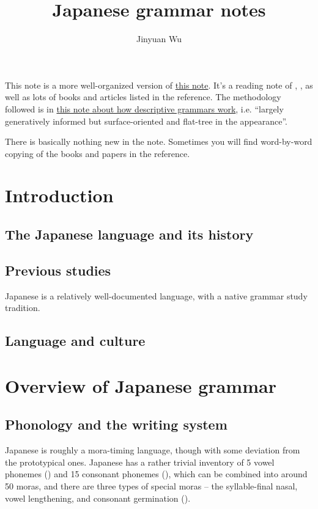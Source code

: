 \documentclass[UTF8, a4paper, oneside, scheme=plain]{ctexrep}
\title{Japanese grammar notes}
\author{Jinyuan Wu}
\newcommand{\method}{\href{../methodology/glossing.pdf}{this note about how descriptive grammars work}}
\begin{document}
\maketitle

This note is a more well-organized version of \href{./japanese-note-1.pdf}{this note}.
It's a reading note of \citet{akiyama2012japanese}, \citet{tsutsui1989dictionary},
as well as lots of books and articles listed in the reference.
The methodology followed is in \method,
i.e. ``largely generatively informed but surface-oriented and flat-tree in the appearance''.

There is basically nothing new in the note. 
Sometimes you will find word-by-word copying of the books and papers in the reference.

\chapter{Introduction}

\section{The Japanese language and its history}

\section{Previous studies}

Japanese is a relatively well-documented language,
with a native grammar study tradition.

\section{Language and culture}

\chapter{Overview of Japanese grammar}


\section{Phonology and the writing system}

Japanese is roughly a mora-timing language,
though with some deviation from the prototypical ones.
Japanese has a rather trivial inventory of 5 vowel phonemes () 
and 15 consonant phonemes (),
which can be combined into around 50 moras,
and there are three types of special moras -- 
the syllable-final nasal, vowel lengthening, and consonant germination 
().
\end{document}
